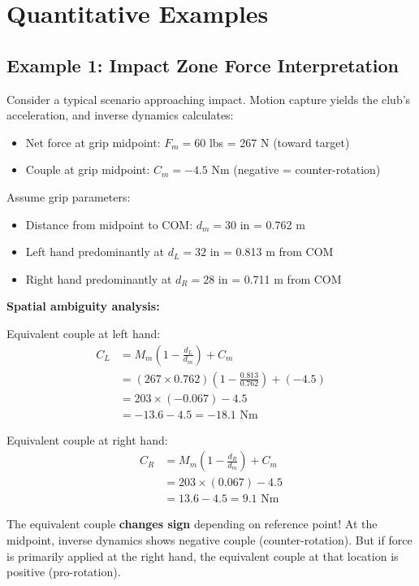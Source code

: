 \documentclass[11pt,a4paper]{article}
\theoremstyle{definition}
\theoremstyle{plain}
\begin{document}
\section{Quantitative Examples}

\subsection{Example 1: Impact Zone Force Interpretation}

Consider a typical scenario approaching impact. Motion capture yields the club's acceleration, and inverse dynamics calculates:
\begin{itemize}
    \item Net force at grip midpoint: $F_m = 60$ lbs = 267 N (toward target)
    \item Couple at grip midpoint: $C_m = -4.5$ Nm (negative = counter-rotation)
\end{itemize}

Assume grip parameters:
\begin{itemize}
    \item Distance from midpoint to COM: $d_m = 30$ in = 0.762 m
    \item Left hand predominantly at $d_L = 32$ in = 0.813 m from COM
    \item Right hand predominantly at $d_R = 28$ in = 0.711 m from COM
\end{itemize}

\textbf{Spatial ambiguity analysis:}

Equivalent couple at left hand:
\begin{align}
C_L &= M_m \left(1 - \frac{d_L}{d_m}\right) + C_m \\
&= (267 \times 0.762) \left(1 - \frac{0.813}{0.762}\right) + (-4.5) \\
&= 203 \times (-0.067) - 4.5 \\
&= -13.6 - 4.5 = -18.1 \text{ Nm}
\end{align}

Equivalent couple at right hand:
\begin{align}
C_R &= M_m \left(1 - \frac{d_R}{d_m}\right) + C_m \\
&= 203 \times (0.067) - 4.5 \\
&= 13.6 - 4.5 = 9.1 \text{ Nm}
\end{align}

\begin{keypoint}
The equivalent couple \textbf{changes sign} depending on reference point! At the midpoint, inverse dynamics shows negative couple (counter-rotation). But if force is primarily applied at the right hand, the equivalent couple at that location is positive (pro-rotation).
\end{keypoint}
\end{document}
